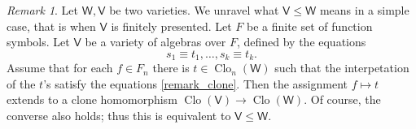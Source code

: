 \documentclass{amsart}
\theoremstyle{plain}
\theoremstyle{definition}
\theoremstyle{remark}
\newtheorem{remark}[theorem]{Remark}
\DeclareMathOperator{\Clo}{Clo}
\begin{document}
\begin{remark}
    Let $\mathsf{W}, \mathsf{V}$ be two varieties. 
    We unravel what $\mathsf{V} \le \mathsf{W}$ means in a simple case, that is when $\mathsf{V}$ is finitely presented. 
    Let $F$ be a finite set of function symbols.
    Let $\mathsf{V}$ be a variety of algebras over $F$, defined by the equations 
    \begin{equation}
        \label{remark_clone}
        s_1 \equiv t_1,\ldots, s_k \equiv t_k \tag{$\star$}\text{.}
    \end{equation} 
    Assume that for each $f \in F_n$ there is $t \in \Clo_n(\mathsf{W})$ such that the interpetation of the $t$'s satisfy the equations \eqref{remark_clone}. 
    Then the assignment $f \mapsto t$ extends to a clone homomorphism $\Clo(\mathsf{V}) \to \Clo(\mathsf{W})$. 
    Of course, the converse also holds; thus this is equivalent to $\mathsf{V} \le \mathsf{W}$. 
\end{remark}
\end{document}
